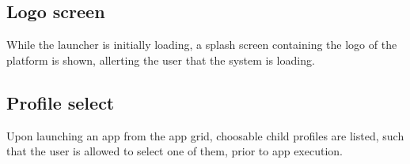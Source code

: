 %
\subsection{Logo screen}
\label{backlog:logo_screen}
While the launcher is initially loading, a splash screen containing the logo of the \giraf[] platform is shown, allerting the user that the system is loading.

%
\subsection{Profile select}
\label{backlog:profile_select}
Upon launching an app from the app grid, choosable child profiles are listed, such that the user is allowed to select one of them, prior to app execution.
